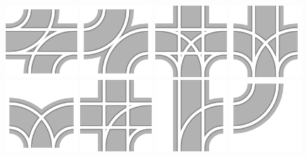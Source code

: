 \documentclass[12pt, letterpaper]{article}
\begin{document}
\includegraphics[width=0.20\textwidth]{Track_38.png}
\includegraphics[width=0.20\textwidth]{Track_39.png}
\includegraphics[width=0.20\textwidth]{Track_40.png}
\includegraphics[width=0.20\textwidth]{Track_41.png}
\includegraphics[width=0.20\textwidth]{Track_43.png}
\includegraphics[width=0.20\textwidth]{Track_44.png}
\includegraphics[width=0.20\textwidth]{Track_45.png}
\includegraphics[width=0.20\textwidth]{Track_55.png}
\end{document}

